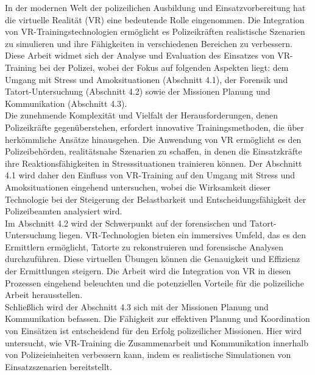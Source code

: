In der modernen Welt der polizeilichen Ausbildung und Einsatzvorbereitung hat die virtuelle Realität (VR) eine bedeutende Rolle eingenommen. 
Die Integration von VR-Trainingstechnologien ermöglicht es  Polizeikräften realistische Szenarien zu simulieren und ihre Fähigkeiten in verschiedenen Bereichen zu verbessern. 
Diese Arbeit widmet sich der Analyse und Evaluation des Einsatzes von VR-Training bei der Polizei, wobei der Fokus auf folgenden Aspekten liegt: dem Umgang mit Stress und Amoksituationen (Abschnitt 4.1), 
der Forensik und Tatort-Untersuchung (Abschnitt 4.2) sowie der Missionen Planung und Kommunikation (Abschnitt 4.3).
\\
Die zunehmende Komplexität und Vielfalt der Herausforderungen, denen Polizeikräfte gegenüberstehen, erfordert innovative Trainingsmethoden, die über herkömmliche Ansätze hinausgehen.
Die Anwendung von VR ermöglicht es den Polizeibehörden, realitätsnahe Szenarien zu schaffen, in denen die Einsatzkräfte ihre Reaktionsfähigkeiten in Stresssituationen trainieren können. 
Der Abschnitt 4.1 wird daher den Einfluss von VR-Training auf den Umgang mit Stress und Amoksituationen eingehend untersuchen, 
wobei die Wirksamkeit dieser Technologie bei der Steigerung der Belastbarkeit und Entscheidungsfähigkeit der Polizeibeamten analysiert wird.
\\
Im Abschnitt 4.2 wird der Schwerpunkt auf der forensischen und Tatort-Untersuchung liegen. 
VR-Technologien bieten ein immersives Umfeld, das es den Ermittlern ermöglicht, Tatorte zu rekonstruieren und forensische Analysen durchzuführen. 
Diese virtuellen Übungen können die Genauigkeit und Effizienz der Ermittlungen steigern. 
Die Arbeit wird die Integration von VR in diesen Prozessen eingehend beleuchten und die potenziellen Vorteile für die polizeiliche Arbeit herausstellen.
\\
Schließlich wird der Abschnitt 4.3 sich mit der Missionen Planung und Kommunikation befassen.
Die Fähigkeit zur effektiven Planung und Koordination von Einsätzen ist entscheidend für den Erfolg polizeilicher Missionen. 
Hier wird untersucht, wie VR-Training die Zusammenarbeit und Kommunikation innerhalb von Polizeieinheiten verbessern kann, indem es realistische Simulationen von Einsatzszenarien bereitstellt. 
